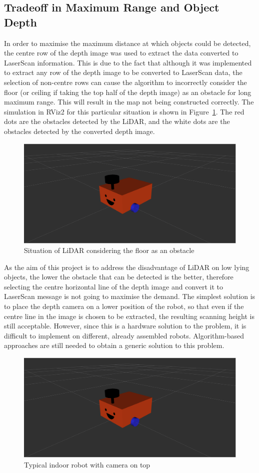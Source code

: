 \subsection{Tradeoff in Maximum Range and Object Depth}
\label{subsec:tradeoff}
In order to maximise the maximum distance at which objects could be detected, 
the centre row of the depth image was used to extract the data converted to LaserScan information. 
This is due to the fact that although it was implemented to extract any row of the depth image to be converted to LaserScan data, 
the selection of non-centre rows can cause the algorithm to incorrectly consider the floor (or ceiling if taking the top half of the depth image) 
as an obstacle for long maximum range. This will result in the map not being constructed correctly. 
The simulation in RViz2 for this particular situation is shown in Figure~\ref{fig:floor_obstacle}.
The red dots are the obstacles detected by the LiDAR, and the white dots are the obstacles detected by the converted depth image.
\begin{figure}[H]
    \centering
    \includegraphics[width=0.8\linewidth]{figs/robot.png}
    \caption{Situation of LiDAR considering the floor as an obstacle}
    \label{fig:floor_obstacle}
\end{figure}
As the aim of this project is to address the disadvantage of LiDAR on low lying objects, 
the lower the obstacle that can be detected is the better, 
therefore selecting the centre horizontal line of the depth image 
and convert it to LaserScan message is not going to maximise the demand. 
The simplest solution is to place the depth camera on a lower position of the robot, 
so that even if the centre line in the image is chosen to be extracted, 
the resulting scanning height is still acceptable. 
However, since this is a hardware solution to the problem, 
it is difficult to implement on different, already assembled robots. 
Algorithm-based approaches are still needed to obtain a generic solution to this problem. 

\begin{figure}[H]
    \centering
    \includegraphics[width=0.8\linewidth]{figs/robot.png}
    \caption{Typical indoor robot with camera on top}
\end{figure}

